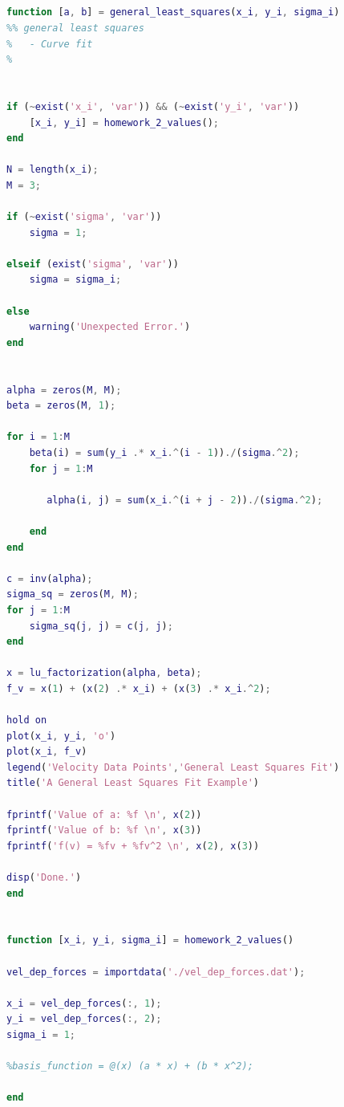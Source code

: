 \documentclass[12pt]{article}
\begin{document}
\subsection*{}
\begin{lstlisting}[language=Matlab, caption=General Least Squares Matlab Program]
function [a, b] = general_least_squares(x_i, y_i, sigma_i)
%% general least squares
%   - Curve fit
%   


if (~exist('x_i', 'var')) && (~exist('y_i', 'var'))
    [x_i, y_i] = homework_2_values(); 
end

N = length(x_i);
M = 3;

if (~exist('sigma', 'var'))
    sigma = 1;
    
elseif (exist('sigma', 'var'))
    sigma = sigma_i;
    
else
    warning('Unexpected Error.')
end


alpha = zeros(M, M);
beta = zeros(M, 1);

for i = 1:M
    beta(i) = sum(y_i .* x_i.^(i - 1))./(sigma.^2);
    for j = 1:M
        
       alpha(i, j) = sum(x_i.^(i + j - 2))./(sigma.^2);
        
    end
end

c = inv(alpha);
sigma_sq = zeros(M, M);
for j = 1:M
    sigma_sq(j, j) = c(j, j);
end

x = lu_factorization(alpha, beta);
f_v = x(1) + (x(2) .* x_i) + (x(3) .* x_i.^2);

hold on
plot(x_i, y_i, 'o')
plot(x_i, f_v)
legend('Velocity Data Points','General Least Squares Fit')
title('A General Least Squares Fit Example')

fprintf('Value of a: %f \n', x(2))
fprintf('Value of b: %f \n', x(3))
fprintf('f(v) = %fv + %fv^2 \n', x(2), x(3))

disp('Done.')
end


function [x_i, y_i, sigma_i] = homework_2_values()

vel_dep_forces = importdata('./vel_dep_forces.dat');

x_i = vel_dep_forces(:, 1);
y_i = vel_dep_forces(:, 2);
sigma_i = 1;

%basis_function = @(x) (a * x) + (b * x^2);

end
\end{lstlisting}
\end{document}

